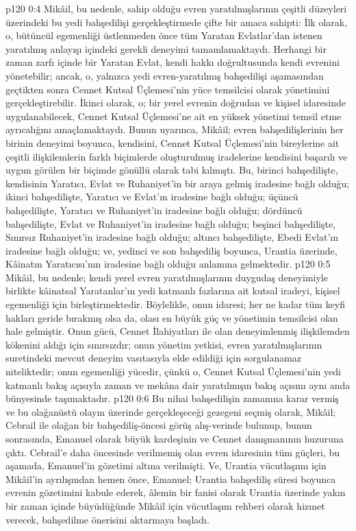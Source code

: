 \vs p120 0:4 Mikâil, bu nedenle, sahip olduğu evren yaratılmışlarının çeşitli düzeyleri üzerindeki bu yedi bahşedilişi gerçekleştirmede çifte bir amaca sahipti: İlk olarak, o, bütüncül egemenliği üstlenmeden önce tüm Yaratan Evlatlar’dan istenen yaratılmış anlayışı içindeki gerekli deneyimi tamamlamaktaydı. Herhangi bir zaman zarfı içinde bir Yaratan Evlat, kendi hakkı doğrultusunda kendi evrenini yönetebilir; ancak, o, yalnızca yedi evren\hyp{}yaratılmış bahşedilişi aşamasından geçtikten sonra Cennet Kutsal Üçlemesi’nin yüce temsilcisi olarak yönetimini gerçekleştirebilir. İkinci olarak, o; bir yerel evrenin doğrudan ve kişisel idaresinde uygulanabilecek, Cennet Kutsal Üçlemesi’ne ait en yüksek yönetimi temsil etme ayrıcalığını amaçlamaktaydı. Bunun uyarınca, Mikâil; evren bahşedilişlerinin her birinin deneyimi boyunca, kendisini, Cennet Kutsal Üçlemesi’nin bireylerine ait çeşitli ilişkilemlerin farklı biçimlerde oluşturulmuş iradelerine kendisini başarılı ve uygun görülen bir biçimde gönüllü olarak tabi kılmıştı. Bu, birinci bahşedilişte, kendisinin Yaratıcı, Evlat ve Ruhaniyet’in bir araya gelmiş iradesine bağlı olduğu; ikinci bahşedilişte, Yaratıcı ve Evlat’ın iradesine bağlı olduğu; üçüncü bahşedilişte, Yaratıcı ve Ruhaniyet’in iradesine bağlı olduğu; dördüncü bahşedilişte, Evlat ve Ruhaniyet’in iradesine bağlı olduğu; beşinci bahşedilişte, Sınırsız Ruhaniyet’in iradesine bağlı olduğu; altıncı bahşedilişte, Ebedi Evlat’ın iradesine bağlı olduğu; ve, yedinci ve son bahşediliş boyunca, Urantia üzerinde, Kâinatın Yaratıcısı’nın iradesine bağlı olduğu anlamına gelmektedir.
\vs p120 0:5 Mikâil, bu nedenle; kendi yerel evren yaratılmışlarının duygudaş deneyimiyle birlikte kâinatsal Yaratanlar’ın yedi katmanlı fazlarına ait kutsal iradeyi, kişisel egemenliği için birleştirmektedir. Böylelikle, onun idaresi; her ne kadar tüm keyfi hakları geride bırakmış olsa da, olası en büyük güç ve yönetimin temsilcisi olan hale gelmiştir. Onun gücü, Cennet İlahiyatları ile olan deneyimlenmiş ilişkilemden kökenini aldığı için sınırsızdır; onun yönetim yetkisi, evren yaratılmışlarının suretindeki mevcut deneyim vasıtasıyla elde edildiği için sorgulanamaz niteliktedir; onun egemenliği yücedir, çünkü o, Cennet Kutsal Üçlemesi’nin yedi katmanlı bakış açısıyla zaman ve mekâna dair yaratılmışın bakış açısını aynı anda bünyesinde taşımaktadır.
\vs p120 0:6 Bu nihai bahşedilişin zamanına karar vermiş ve bu olağanüstü olayın üzerinde gerçekleşeceği gezegeni seçmiş olarak, Mikâil; Cebrail ile olağan bir bahşediliş\hyp{}öncesi görüş alış\hyp{}verinde bulunup, bunun sonrasında, Emanuel olarak büyük kardeşinin ve Cennet danışmanının huzuruna çıktı. Cebrail’e daha öncesinde verilmemiş olan evren idaresinin tüm güçleri, bu aşamada, Emanuel’in gözetimi altına verilmişti. Ve, Urantia vücutlaşımı için Mikâil’in ayrılışından hemen önce, Emanuel; Urantia bahşediliş süresi boyunca evrenin gözetimini kabule ederek, âlemin bir fanisi olarak Urantia üzerinde yakın bir zaman içinde büyüdüğünde Mikâil için vücutlaşım rehberi olarak hizmet verecek, bahşedilme önerisini aktarmaya başladı.

